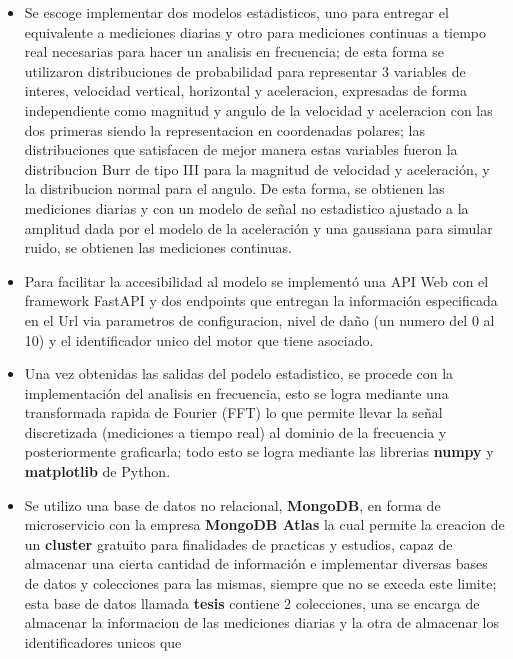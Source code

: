\begin{itemize}
    \item Se escoge implementar dos modelos estadisticos, uno para entregar el
        equivalente a mediciones diarias y otro para mediciones continuas a tiempo
        real necesarias para hacer un analisis en frecuencia; de esta forma se
        utilizaron distribuciones de probabilidad para representar 3 variables de interes,
        velocidad vertical, horizontal y aceleracion, expresadas de forma independiente
        como magnitud y angulo de la velocidad y aceleracion con las dos primeras
        siendo la representacion en coordenadas polares; las distribuciones que
        satisfacen de mejor manera estas variables fueron la distribucion Burr
        de tipo III para la magnitud de velocidad y aceleración, y la distribucion
        normal para el angulo. De esta forma, se obtienen las mediciones diarias
        y con un modelo de señal no estadistico ajustado a la amplitud dada por
        el modelo de la aceleración y una gaussiana para simular ruido, se obtienen
        las mediciones continuas.
    \item Para facilitar la accesibilidad al modelo se implementó una API Web con
        el framework FastAPI y dos endpoints que entregan la información especificada
        en el Url via parametros de configuracion, nivel de daño (un numero del 0 al 10)
        y el identificador unico del motor que tiene asociado.
    \item Una vez obtenidas las salidas del podelo estadistico, se procede con
        la implementación del analisis en frecuencia, esto se logra mediante una
        transformada rapida de Fourier (FFT) lo que permite llevar la señal
        discretizada (mediciones a tiempo real) al dominio de la frecuencia
        y posteriormente graficarla; todo esto se logra mediante las librerias
        \textbf{numpy} y \textbf{matplotlib} de Python.
    \item  Se utilizo una base de datos no relacional, \textbf{MongoDB}, en forma
        de microservicio con la empresa \textbf{MongoDB Atlas} la cual permite
        la creacion de un \textbf{cluster} gratuito para finalidades de practicas
        y estudios, capaz de almacenar una cierta cantidad de información e
        implementar diversas bases de datos y colecciones para las mismas, siempre
        que no se exceda este limite; esta base de datos llamada \textbf{tesis}
        contiene 2 colecciones, una se encarga de almacenar la informacion de las
        mediciones diarias y la otra de almacenar los identificadores unicos que

\end{itemize}
